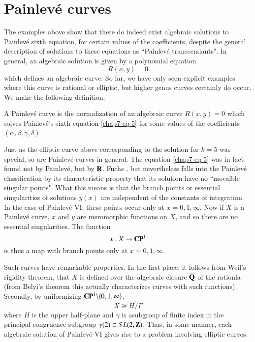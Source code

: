 \section{Painlev\'e curves}\label{chap7-sec-7}
\pageoriginale

The examples above show that there do indeed exist algebraic solutions to Painlev\'e sixth equation, for certain values of the coefficients, despite the general description of solutions to these equations as ``Painlev\'e transcendants". In general, an algebraic solution is given by a polynomial equation
$$
R(x,y) = 0
$$
which defines an algebraic curve. So far, we have only seen explicit examples where this curve is rational or elliptic, but higher genus curves certainly do occur. We make the following definition:

\setcounter{defn}{1}
\begin{defn}\label{chap7-definition-2}
A Painlev\'e curve is the normalization of an algebraic curve $R(x,y)=0$ which solves Painlev\'e's sixth equation
\eqref{chap7-eq-5} for some values of the coefficients $(\alpha, \beta, \gamma, \delta)$.
\end{defn}
 Just as the elliptic curve above corresponding to the solution for $k=5$ was special, so are Painlev\'e curves in general. The equation \eqref{chap7-eq-5} was in fact found not by Painlev\'e, but by $\mathbf{R}$. Fuchs \cite{chap7-key4}, but nevertheless falls into the Painlev\'e classification by its characteristic property that its solution have no ``movalble singular points". What this means is that the branch points or essential singularities of solutions $y(x)$ are independent of the constants of integration. In the case of Painlev\'e VI, these points occur only at $x=0,1, \infty$. Now if $X$ is a Painlev\'e curve, $x$ and $y$ are meromorphic functions on $X$, and so there are no essential singularities. The function
 $$
 x : X\rightarrow \mathbf{C}\mathbf{P}^{1}
 $$
 is thus a map with branch points only at $x=0,1, \infty.$

 Such curves have remarkable properties. In the first place, it follows from Weil's rigidity theorem\cite{chap7-key17}, that $X$ is defined over the algebraic closure $\overline{\mathbf{Q}}$ of the rationla (from Belyi's theorem \cite{chap7-key2} this actually characterizes curves with such functions). Secondly, by uniformizing $\mathbf{C}\mathbf{P}^{1}\backslash\{0,1,\infty\}$,
$$
X\cong \overline{H/\Gamma}
$$
where $H$ is the upper half-plane and $\gamma$ is asubgroup of finite index in the principal congruence subgroup $\gamma(2) \subset SL(2,\mathbf{Z})$. Thus, in some manner, each algebraic solution of Painlev\'e VI gives rise to a problem involving elliptic curves.

